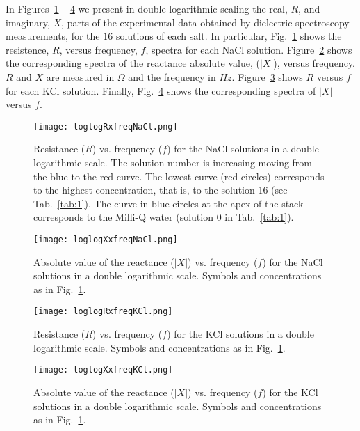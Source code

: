 \documentclass[preprint,aps,pre]{revtex4}
\begin{document}
\clearpage


In Figures~\ref{NaClR} -- \ref{KClX} we present in double logarithmic scaling the real, $R$, and imaginary, $X$, parts of the experimental data obtained by dielectric spectroscopy measurements, for the $16$ solutions of each salt. In particular, Fig.~\ref{NaClR} shows the resistence, $R$, versus frequency, $f$, spectra for each NaCl solution. Figure~\ref{NaClX} shows the corresponding spectra of the reactance absolute value, ($\left|X\right|$), versus frequency. $R$ and $X$ are measured in $\Omega$ and the frequency in $Hz$. Figure~\ref{KClR} shows $R$ versus $f$ for each KCl solution. Finally, Fig.~\ref{KClX} shows the corresponding spectra of $\left|X\right|$ versus $f$.


\begin{figure}[htb]
	\texttt{[image: loglogRxfreqNaCl.png]}
		\caption{Resistance ($R$) vs. frequency ($f$) for the NaCl solutions in a double logarithmic scale. The solution number is increasing moving from the blue to the red curve. The lowest curve (red circles) corresponds to the highest concentration, that is, to the solution 16 (see Tab.~\ref{tab:1}). The curve in blue circles at the apex of the stack corresponds to the Milli-Q water (solution 0 in Tab.~\ref{tab:1}).}
		\label{NaClR}
\end{figure}

\begin{figure}[htb]
	\texttt{[image: loglogXxfreqNaCl.png]}
		\caption{Absolute value of the reactance ($\left|X\right|$) vs. frequency ($f$) for the NaCl solutions in a double logarithmic scale. Symbols and concentrations as in Fig.~\ref{NaClR}.}
		\label{NaClX}
\end{figure}

\begin{figure}[htb]
	\texttt{[image: loglogRxfreqKCl.png]}
		\caption{Resistance ($R$) vs. frequency ($f$) for the KCl solutions in a double logarithmic scale. Symbols and concentrations as in Fig.~\ref{NaClR}.}
		\label{KClR}
\end{figure}

\begin{figure}[htb]
	\texttt{[image: loglogXxfreqKCl.png]}
		\caption{Absolute value of the reactance ($\left|X\right|$) vs. frequency ($f$) for the KCl solutions in a double logarithmic scale. Symbols and concentrations as in Fig.~\ref{NaClR}.}
		\label{KClX}
\end{figure}
\end{document}
